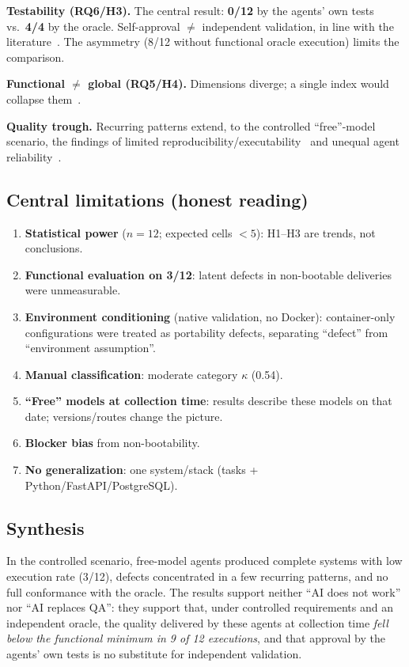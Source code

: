 \documentclass[sigconf,anonymous]{acmart}
\begin{document}
\textbf{Testability (RQ6/H3).} The central result: \textbf{0/12} by the agents' own tests vs.\ \textbf{4/4} by the oracle. Self-approval $\ne$ independent validation, in line with the literature~\cite{C03,C04,C05,C06}. The asymmetry (8/12 without functional oracle execution) limits the comparison.

\textbf{Functional $\ne$ global (RQ5/H4).} Dimensions diverge; a single index would collapse them~\cite{D04}.

\textbf{Quality trough.} Recurring patterns extend, to the controlled ``free''-model scenario, the findings of limited reproducibility/executability~\cite{F02} and unequal agent reliability~\cite{F05}.

\subsection{Central limitations (honest reading)}
\begin{enumerate}
\item \textbf{Statistical power} ($n=12$; expected cells $<5$): H1--H3 are trends, not conclusions.
\item \textbf{Functional evaluation on 3/12}: latent defects in non-bootable deliveries were unmeasurable.
\item \textbf{Environment conditioning} (native validation, no Docker): container-only configurations were treated as portability defects, separating ``defect'' from ``environment assumption''.
\item \textbf{Manual classification}: moderate category $\kappa$ (0.54).
\item \textbf{``Free'' models at collection time}: results describe these models on that date; versions/routes change the picture.
\item \textbf{Blocker bias} from non-bootability.
\item \textbf{No generalization}: one system/stack (tasks + Python/FastAPI/PostgreSQL).
\end{enumerate}

\subsection{Synthesis}
In the controlled scenario, free-model agents produced complete systems with low execution rate (3/12), defects concentrated in a few recurring patterns, and no full conformance with the oracle. The results support neither ``AI does not work'' nor ``AI replaces QA'': they support that, under controlled requirements and an independent oracle, the quality delivered by these agents at collection time \emph{fell below the functional minimum in 9 of 12 executions}, and that approval by the agents' own tests is no substitute for independent validation.
\end{document}
